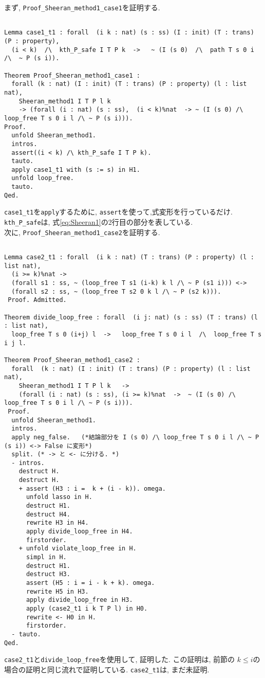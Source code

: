 \documentclass{jsarticle}
\begin{document}
\newpage

まず, \texttt{Proof\_Sheeran\_method1\_case1}を証明する.

\begin{lstlisting}[language = Coq, frame=tb, framesep=5pt, breaklines = true] % path

Lemma case1_t1 : forall  (i k : nat) (s : ss) (I : init) (T : trans) (P : property),
  (i < k)  /\  kth_P_safe I T P k  ->   ~ (I (s 0)  /\  path T s 0 i  /\  ~ P (s i)).

Theorem Proof_Sheeran_method1_case1 :
  forall (k : nat) (I : init) (T : trans) (P : property) (l : list nat),
    Sheeran_method1 I T P l k
    -> (forall (i : nat) (s : ss),  (i < k)%nat  -> ~ (I (s 0) /\ loop_free T s 0 i l /\ ~ P (s i))).
Proof.
  unfold Sheeran_method1.
  intros.
  assert((i < k) /\ kth_P_safe I T P k).
  tauto.
  apply case1_t1 with (s := s) in H1.  
  unfold loop_free.
  tauto.
Qed.
\end{lstlisting}
\texttt{case1\_t1}を\texttt{apply}するために, \texttt{assert}を使って,式変形を行っているだけ.
\texttt{kth\_P\_safe}は, 式\eqref{eq:Sheeran1}の2行目の部分を表している.\\

次に, \texttt{Proof\_Sheeran\_method1\_case2}を証明する.
\begin{lstlisting}[language = Coq,  frame=tb, framesep=5pt, breaklines = true] % path

Lemma case2_t1 : forall  (i k : nat) (T : trans) (P : property) (l : list nat),
  (i >= k)%nat ->
  (forall s1 : ss, ~ (loop_free T s1 (i-k) k l /\ ~ P (s1 i))) <->  
  (forall s2 : ss, ~ (loop_free T s2 0 k l /\ ~ P (s2 k))).
 Proof. Admitted. 
 
Theorem divide_loop_free : forall  (i j: nat) (s : ss) (T : trans) (l : list nat),
  loop_free T s 0 (i+j) l  ->   loop_free T s 0 i l  /\  loop_free T s i j l.
  
Theorem Proof_Sheeran_method1_case2 :
  forall  (k : nat) (I : init) (T : trans) (P : property) (l : list nat),
    Sheeran_method1 I T P l k   ->   
    (forall (i : nat) (s : ss), (i >= k)%nat  ->  ~ (I (s 0) /\ loop_free T s 0 i l /\ ~ P (s i))).
 Proof.
  unfold Sheeran_method1.
  intros.
  apply neg_false.   (*結論部分を I (s 0) /\ loop_free T s 0 i l /\ ~ P (s i)) <-> False に変形*)
  split. (* -> と <- に分ける. *)
  - intros.
    destruct H.
    destruct H.
    + assert (H3 : i =  k + (i - k)). omega.
      unfold lasso in H.
      destruct H1.
      destruct H4.
      rewrite H3 in H4.
      apply divide_loop_free in H4. 
      firstorder.
    + unfold violate_loop_free in H.
      simpl in H.
      destruct H1.
      destruct H3.
      assert (H5 : i = i - k + k). omega.
      rewrite H5 in H3.   
      apply divide_loop_free in H3.
      apply (case2_t1 i k T P l) in H0.
      rewrite <- H0 in H.
      firstorder.
  - tauto.
Qed.        
\end{lstlisting}
\texttt{case2\_t1}と\texttt{divide\_loop\_free}を使用して, 証明した. 
この証明は, 前節の $k \leq i$の場合の証明と同じ流れで証明している. 
\texttt{case2\_t1}は, まだ未証明. 
\end{document}
